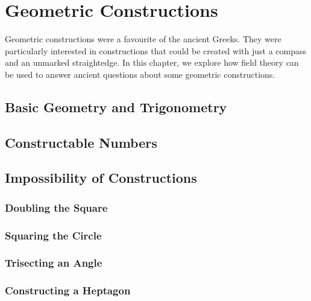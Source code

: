 \chapter{Geometric Constructions}
Geometric constructions were a favourite of the ancient Greeks. They were particularly interested in constructions that could be created with just a compass and an unmarked straightedge. In this chapter, we explore how field theory can be used to answer ancient questions about some geometric constructions.

\section{Basic Geometry and Trigonometry}

\section{Constructable Numbers}

\section{Impossibility of Constructions}

\subsection{Doubling the Square}

\subsection{Squaring the Circle}

\subsection{Trisecting an Angle}

\subsection{Constructing a Heptagon}
